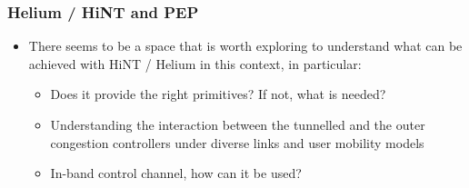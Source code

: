 \begin{frame}
  \frametitle{Helium / HiNT and PEP}
  \begin{itemize}
    \item There seems to be a space that is worth exploring to understand what can be achieved with HiNT / Helium in this context, in particular:
    \begin{itemize}
      \item Does it provide the right primitives?  If not, what is needed?
      \item Understanding the interaction between the tunnelled and the outer congestion controllers under diverse links and user mobility models
      \item In-band control channel, how can it be used?
    \end{itemize}
  \end{itemize}
\end{frame}

